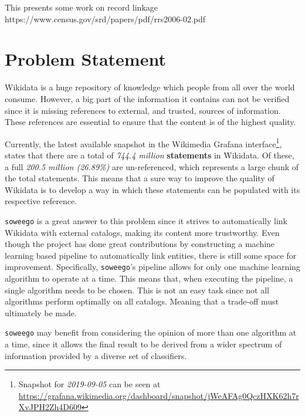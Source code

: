 \documentclass[epsfig,a4paper,11pt,titlepage,twoside,openany]{book}
\begin{document}
This presents some work on record linkage
https://www.census.gov/srd/papers/pdf/rrs2006-02.pdf



\cite{Wilson2011_slp_in_rl}


\chapter{Problem Statement}
\label{chap:problem-statement}

Wikidata is a huge repository of knowledge which people from all over the world consume. However, a big part of the information it contains can not be verified since it is missing references to external, and trusted, sources of information. These references are essential to ensure that the content is of the highest quality. 

Currently, the latest available snapshot in the Wikimedia Grafana interface\footnote{Snapshot for \textit{2019-09-05} can be seen at \url{https://grafana.wikimedia.org/dashboard/snapshot/jWeAFAg0QczHXK62h7rXvJPH2Zh4D609}}, states that there are a total of \textit{744.4 million} \textbf{statements} in Wikidata. Of these, a full \textit{200.5 million (26.89\%)} are un-referenced, which represents a large chunk of the total statements. This means that a sure way to improve the quality of Wikidata is to develop a way in which these statements can be populated with its respective reference.

\texttt{soweego} is a great answer to this problem since it strives to automatically link Wikidata with external catalogs, making its content more trustworthy. Even though the project has done great contributions by constructing a machine learning based pipeline to automatically link entities, there is still some space for improvement. Specifically, \texttt{soweego}'s pipeline allows for only one machine learning algorithm to operate at a time. This means that, when executing the pipeline, a single algorithm needs to be chosen. This is not an easy task since not all algorithms perform optimally on all catalogs. Meaning that a trade-off must ultimately be made.

\texttt{soweego} may benefit from considering the opinion of more than one algorithm at a time, since it allows the final result to be derived from a wider spectrum of information provided by a diverse set of classifiers. 
\end{document}
